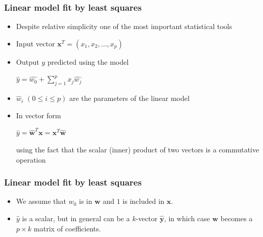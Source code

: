 \documentclass[notes]{beamer}          %
\newcommand{\vect}[1]{\bm{#1}}
\begin{document}
\begin{frame}
\frametitle{Linear model fit by least squares}
    \begin{itemize}
        \item Despite relative simplicity one of the most important statistical tools
        \item Input vector $\vect{x}^T = (x_1, x_2, \ldots, x_p)$
        \item Output $y$ predicted using the model \\
            \begin{center}
            $\hat{y} = \hat{w_0} + \sum_{j=1}^{p} x_j \hat{w_j}$
            \end{center}
        \item $\hat{w}_i$ $ (0 \leq i \leq p)$ are the parameters of the linear model
        \item In vector form
            \begin{center}
            $\hat{y} = \hat{\vect{w}}^T\vect{x} = \vect{x}^T \hat{\vect{w}}$
            \end{center}
            using the fact that the scalar (inner) product of two vectors is a commutative operation
    \end{itemize}
\end{frame}

\begin{frame}
\frametitle{Linear model fit by least squares}
    \begin{itemize}
        \item  We assume that $w_0$ is in $\vect{w}$ and $1$ is included in $\vect{x}$.
        \item $\hat{y}$ is a scalar, but in general can be a $k$-vector $\hat{\vect{y}}$, in which case $\vect{w}$ becomes a $p \times k$ matrix of coefficients.
    \end{itemize}
\end{frame}
\end{document}
